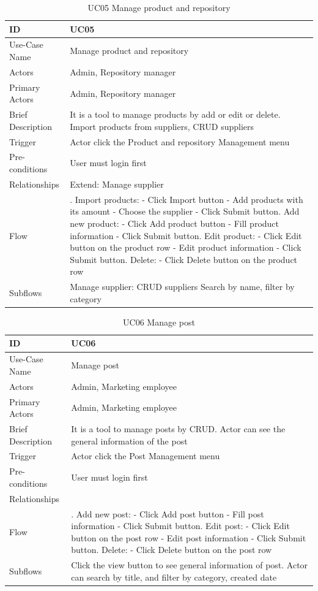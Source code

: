 \begin{table}
\begin{tabular}{|>{\raggedright\arraybackslash}p{5cm}|>{\raggedright\arraybackslash}p{10cm}|}
\hline
ID& UC05 \\
\hline
Use-Case Name& Manage product and repository\\
\hline
Actors& Admin, Repository manager\\
\hline
Primary Actors& Admin, Repository manager\\
\hline
Brief Description& It is a tool to manage products by add or edit or delete. Import products from suppliers, CRUD suppliers\\
\hline
Trigger& Actor click the Product and repository Management menu\\
\hline
Pre-conditions& User must login first \\
\hline
Relationships& Extend: Manage supplier\\
\hline
Flow& 
1. Import products:\break
- Click Import button\break
- Add products with its amount\break
- Choose the supplier\break
- Click Submit button\break
2. Add new product:\break
- Click Add product button \break
- Fill product information\break
- Click Submit button\break
3. Edit product:\break
- Click Edit button on the product row\break
- Edit product information\break
- Click Submit button\break
4. Delete:\break
- Click Delete button on the product row\\
\hline
Subflows& 
Manage supplier: CRUD suppliers\break
Search by name, filter by category
\\
\hline
\end{tabular}
\caption{UC05 Manage product and repository}
\label{tab:UC05}
\end{table}
\begin{table}
\begin{tabular}{|>{\raggedright\arraybackslash}p{5cm}|>{\raggedright\arraybackslash}p{10cm}|}
\hline
ID& UC06 \\
\hline
Use-Case Name& Manage post \\
\hline
Actors& Admin, Marketing employee\\
\hline
Primary Actors& Admin, Marketing employee\\
\hline
Brief Description& It is a tool to manage posts by CRUD. Actor can see the general information of the post\\
\hline
Trigger& Actor click the Post Management menu\\
\hline
Pre-conditions& User must login first \\
\hline
Relationships&\\
\hline
Flow& 
1. Add new post:\break
- Click Add post button \break
- Fill post information\break
- Click Submit button\break
2. Edit post:\break
- Click Edit button on the post row\break
- Edit post information\break
- Click Submit button\break
3. Delete:\break
- Click Delete button on the post row\\
\hline
Subflows& Click the view button to see general information of post.\break
Actor can search by title, and filter by category, created date
\\
\hline
\end{tabular}
\caption{UC06 Manage post}
\label{tab:UC06}
\end{table}
